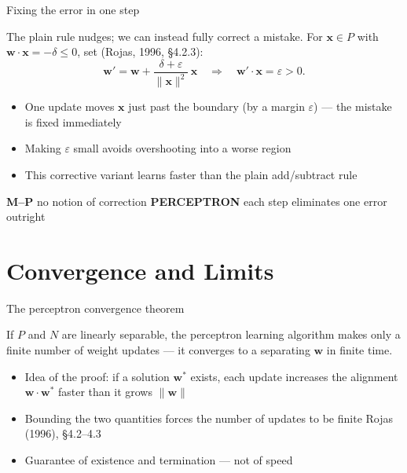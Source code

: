 \documentclass[aspectratio=169, 11pt]{beamer}
\newcommand{\mppar}[2]{%
  \vfill
  {\footnotesize
  \begin{tcolorbox}[enhanced, sidebyside, sidebyside align=top,
                    lefthand ratio=0.485,
                    segmentation style={mpc!35, line width=0.6pt},
                    colback=mpc!5, colframe=mpc!35, boxrule=0.5pt,
                    arc=1.5mm, left=2mm, right=2mm, top=0.8mm, bottom=0.8mm]
    {\color{mpc}\textbf{M--P}}\;\; #1
  \tcblower
    {\color{pcc}\textbf{PERCEPTRON}}\;\; #2
  \end{tcolorbox}}%
  \vspace{0.6em}%
}
\newcommand{\src}[3]{}      %
\begin{document}
\begin{frame}{Fixing the error in one step}
  \src{rojas1996}{section}{4.2.3}
  The plain rule nudges; we can instead \alert{fully correct}
  a mistake. For $\mathbf{x}\in P$ with
  $\mathbf{w}\!\cdot\!\mathbf{x} = -\delta \le 0$, set
  (Rojas, 1996, \S4.2.3):
  \[
    \mathbf{w}' = \mathbf{w}
    + \frac{\delta + \varepsilon}{\lVert\mathbf{x}\rVert^2}\,
    \mathbf{x}
    \quad\Rightarrow\quad
    \mathbf{w}'\!\cdot\!\mathbf{x} = \varepsilon > 0.
  \]
  \begin{itemize}\setlength{\itemsep}{1pt}
    \item One update moves $\mathbf{x}$ just past the boundary
          (by a margin $\varepsilon$) --- the mistake is
          \alert{fixed immediately}
    \item Making $\varepsilon$ small avoids overshooting into
          a worse region
    \item This \alert{corrective} variant learns faster than
          the plain add/subtract rule
  \end{itemize}
  \mppar{no notion of correction}
        {each step \alert{eliminates} one error outright}
\end{frame}

\section{Convergence and Limits}

\begin{frame}{The perceptron convergence theorem}
  \src{rojas1996}{section}{4.2.2}
  \begin{redhighlight}
    If $P$ and $N$ are \alert{linearly separable}, the
    perceptron learning algorithm makes only a
    \alert{finite} number of weight updates --- it converges
    to a separating $\mathbf{w}$ in finite time.
  \end{redhighlight}
  \vspace{0.4em}
  \begin{itemize}\setlength{\itemsep}{2pt}
    \item Idea of the proof: if a solution
          $\mathbf{w}^{*}$ exists, each update increases the
          alignment $\mathbf{w}\!\cdot\!\mathbf{w}^{*}$ faster
          than it grows $\lVert\mathbf{w}\rVert$
    \item Bounding the two quantities forces the number of
          updates to be finite
          \hfill{\scriptsize Rojas (1996), \S4.2--4.3}
    \item Guarantee of \alert{existence and termination} ---
          not of speed
  \end{itemize}
\end{frame}
\end{document}
